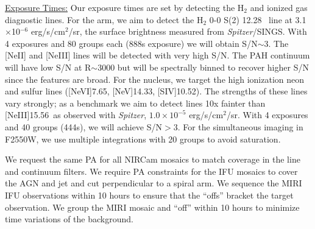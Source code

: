 \documentclass[12pt]{article}
\begin{document}
\vspace{0.05in}

\noindent \underline{Exposure Times:} Our exposure times are set by detecting the H$_2$ and ionized gas diagnostic lines.  For the arm, we aim to detect the H$_2$ 0-0 S(2) 12.28 \micron\ line at 3.1$\times$10$^{-6}$ erg/s/cm$^2$/sr, the surface brightness measured from {\em Spitzer}/SINGS. With 4 exposures and 80 groups each (888s exposure) we will obtain S/N$\sim$3.  The [Ne{\small II}] and [Ne{\small III}] lines will be detected with very high S/N. The PAH continuum will have low S/N at R$\sim$3000 but will be spectrally binned to recover higher S/N since the features are broad.   For the nucleus, we target the high ionization neon and sulfur lines ([Ne{\small VI}]7.65\micron, [Ne{\small V}]14.33\micron, [S{\small IV}]10.52\micron).  The strengths of these lines vary strongly; as a benchmark we aim to detect lines 10x fainter than [Ne{\small III}]15.56\micron\ as observed with {\em Spitzer}, $1.0{\times}10^{-5}$ erg/s/cm$^2$/sr. With 4 exposures and 40 groups (444s), we will achieve S/N$>$3.  For the simultaneous imaging in F2550W, we use multiple integrations with 20 groups to avoid saturation.

\vspace{0.1in}


\vspace{0.1in}



%
%
\specialreq             %
\vspace{-0.15in}
We request the same PA for all NIRCam mosaics to match coverage in the line and continuum filters.  We require PA constraints for the IFU mosaics to cover the AGN and jet and cut perpendicular to a spiral arm.  We sequence the MIRI IFU observations within 10 hours to ensure that the ``offs''  bracket the target observation. We group the MIRI mosaic and ``off'' within 10 hours to minimize time variations of the background.

\end{document}
